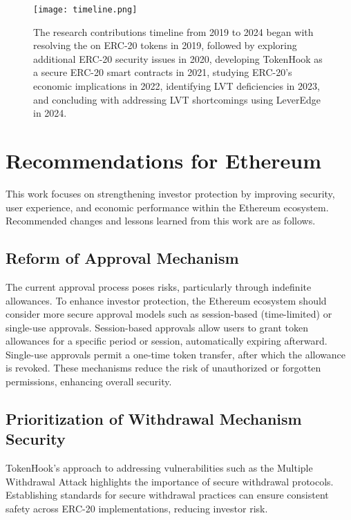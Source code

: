 \begin{figure}[t]
	\centering
	\texttt{[image: timeline.png]}
	\caption[Research contributions timeline]{The research contributions timeline from 2019 to 2024 began with resolving the \mwa on ERC-20 tokens in 2019, followed by exploring additional ERC-20 security issues in 2020, developing TokenHook as a secure ERC-20 smart contracts in 2021, studying ERC-20's economic implications in 2022, identifying LVT deficiencies in 2023, and concluding with addressing LVT shortcomings using LeverEdge in 2024.}
	\label{fig:timeline}
\end{figure}

\section{Recommendations for Ethereum}
This work focuses on strengthening investor protection by improving security, user experience, and economic performance within the Ethereum ecosystem. Recommended changes and lessons learned from this work are as follows. 

\subsection{Reform of Approval Mechanism}
The current approval process poses risks, particularly through indefinite allowances. To enhance investor protection, the Ethereum ecosystem should consider more secure approval models such as session-based (time-limited) or single-use approvals. Session-based approvals allow users to grant token allowances for a specific period or session, automatically expiring afterward. Single-use approvals permit a one-time token transfer, after which the allowance is revoked. These mechanisms reduce the risk of unauthorized or forgotten permissions, enhancing overall security.

\subsection{Prioritization of Withdrawal Mechanism Security}
TokenHook's approach to addressing vulnerabilities such as the Multiple Withdrawal Attack highlights the importance of secure withdrawal protocols. Establishing standards for secure withdrawal practices can ensure consistent safety across ERC-20 implementations, reducing investor risk.

